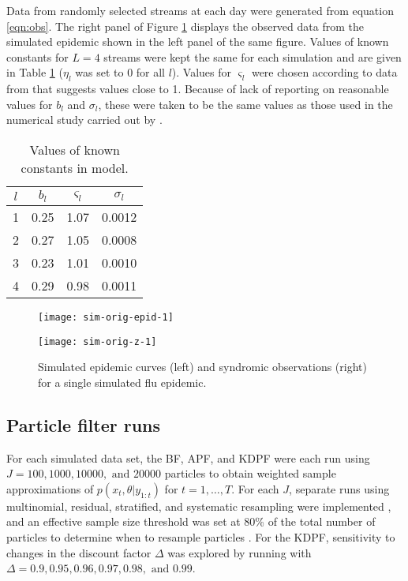 \documentclass{elsarticle}
\begin{document}
Data from randomly selected streams at each day were generated from equation \eqref{eqn:obs}. The right panel of Figure \ref{fig:data} displays the observed data from the simulated epidemic shown in the left panel of the same figure. Values of known constants for $L = 4$ streams were kept the same for each simulation and are given in Table \ref{tab:constants} ($\eta_l$ was set to 0 for all $l$). Values for $\varsigma_l$ were chosen according to data from \citet{chew2010twitter} that suggests values close to 1. Because of lack of reporting on reasonable values for $b_l$ and $\sigma_l$, these were taken to be the same values as those used in the numerical study carried out by \citet{skvortsov2012monitoring}.

\begin{table}[hb]
\begin{center}
\begin{tabular}{|cccc|}
\hline
$l$ & $b_l$ & $\varsigma_l$ & $\sigma_l$ \\
\hline
1 & 0.25 & 1.07 & 0.0012 \\
2 & 0.27 & 1.05 & 0.0008 \\
3 & 0.23 & 1.01 & 0.0010 \\
4 & 0.29 & 0.98 & 0.0011 \\
\hline
\end{tabular}
\caption{Values of known constants in model.}
\label{tab:constants}
\end{center}
\end{table}

\begin{figure}
\centering
\begin{minipage}{0.48\linewidth}
\texttt{[image: sim-orig-epid-1]}
\end{minipage}
\begin{minipage}{0.48\linewidth}
\texttt{[image: sim-orig-z-1]}
\end{minipage}
\caption{Simulated epidemic curves (left) and syndromic observations (right) for a single simulated flu epidemic.} \label{fig:data}
\end{figure}

\subsection{Particle filter runs} \label{sec:pf}

For each simulated data set, the BF, APF, and KDPF were each run using $J = 100, 1000, 10000, \mbox{ and } 20000$ particles to obtain weighted sample approximations of $p(x_t,\theta|y_{1:t})$ for $t = 1,\ldots,T$. For each $J$, separate runs using multinomial, residual, stratified, and systematic resampling were implemented \citep{smcUtils}, and an effective sample size threshold was set at 80\% of the total number of particles to determine when to resample particles \citep{Liu:Chen:Wong:reje:1998}. For the KDPF, sensitivity to changes in the discount factor $\Delta$ was explored by running with $\Delta = 0.9, 0.95, 0.96, 0.97, 0.98, \mbox{ and } 0.99$.
\end{document}
